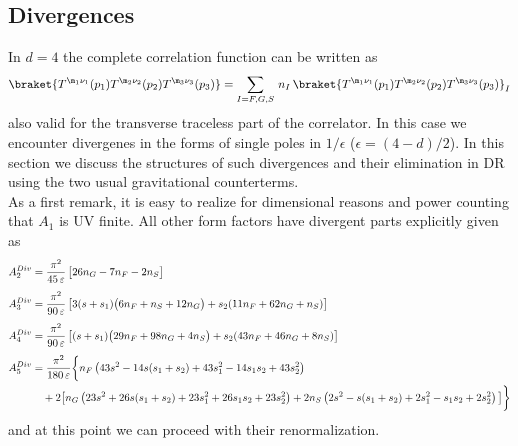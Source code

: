 \documentclass[a4paper,11pt,openright,twoside]{book}
\let\n=\nu      \let\x=\xi     \let\p=\pi      \let\r=\rho
\numberwithin{equation}{section}
\begin{document}
{{\subsection{Divergences}

In $d=4$ the complete correlation function can be written as
\begin{equation}
	\braket{T^{\m_1\n_1}(p_1)T^{\m_2\n_2}(p_2)T^{\m_3\n_3}(p_3)}=\sum_{I=F,G,S}\,n_I\,\braket{T^{\m_1\n_1}(p_1)T^{\m_2\n_2}(p_2)T^{\m_3\n_3}(p_3)}_I
\end{equation}
also valid for the transverse traceless part of the correlator. In this case we encounter divergenes in the forms of single poles in $1/\epsilon$  ($\epsilon=(4-d)/2$). In this section we discuss the structures of such divergences and their elimination in DR using the two usual gravitational counterterms.\\
As a first remark, it is easy to realize for dimensional reasons and power counting that $A_{1}$ is UV finite. All other form factors have divergent parts explicitly given as
\begin{subequations}
	\begin{align}
		A_2^{Div}&=\frac{\p^2}{45\,\varepsilon}\,\big[26n_G-7n_F-2n_S\big]\\[1ex]
		A_3^{Div}&=\frac{\p^2}{90\,\varepsilon}\,\big[3(s+s_1)\big(6n_F+n_S+12n_G\big)+s_2(11n_F+62n_G+n_S)\big]\\[1ex]
		A_4^{Div}&=\frac{\p^2}{90\,\varepsilon}\,\big[(s+s_1)\big(29n_F+98n_G+4n_S\big)+s_2(43n_F+46n_G+8n_S)\big]\\[1ex]
		A_5^{Div}&=\frac{\p^2}{180\,\varepsilon}\bigg\{n_F \left(43 s^2-14 s (s_1+s_2)+43 s_1^2-14 s_1 s_2+43 s_2^2\right)\notag\\
		&\quad+2 \big[n_G \left(23 s^2+26 s (s_1+s_2)+23 s_1^2+26 s_1 s_2+23s_2^2\right)+2n_S\left(2 s^2-s (s_1+s_2)+2 s_1^2-s_1 s_2+2 s_2^2\right)\big]\bigg\}
	\end{align}\label{diverg}
\end{subequations}
and at this point we can proceed with their renormalization. 
}}
\end{document}
